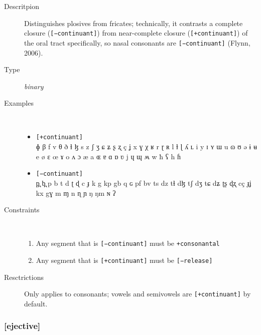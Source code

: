 \documentclass[10pt,letterpaper]{article}
\begin{document}

\begin{description}
\item[Descritpion] Distinguishes plosives from fricates; technically, it contrasts a complete closure (\texttt{[−continuant]}) from near-complete closure (\texttt{[+continuant]}) of the oral tract specifically, so nasal consonants are \texttt{[−continuant]} (Flynn, 2006).
\item[Type] \emph{binary}
\item[Examples]\
  \begin{itemize}
    \item \texttt{[+continuant]}\\
    ɸ β f v θ ð ɬ ɮ s z ʃ ʒ ɕ ʑ ʂ ʐ ç ʝ x ɣ χ ʁ r ɽ ʀ l ɫ ɭ ʎ ʟ i y ɪ ʏ ɯ u ɷ ʊ ə ɨ ʉ e ø ɛ œ ɤ o ʌ ɔ æ a ɶ ɐ ɑ ɒ ʋ j ɥ ɰ ʍ w ħ ʕ h ɦ 
    \item \texttt{[−continuant]}\\
     p̪ b̪ p b t d ʈ ɖ c ɟ k g kp gb q ɢ pf bv ts dz tɬ dɮ tʃ dʒ tɕ dʑ ʈʂ ɖʐ cç ɟʝ kx gɣ m ɱ n ɳ ɲ ŋ ŋm ɴ ʔ 
  \end{itemize}
\item[Constraints]\
  \begin{enumerate}
    \item Any segment that is \texttt{[−continuant]} must be \texttt{+consonantal}
    \item Any segment that is \texttt{[+continuant]} must be \texttt{[−release]}
  \end{enumerate}
\item[Resctrictions] Only applies to consonants; vowels and semivowels are \texttt{[+continuant]} by default.
\end{description}

\subsubsection{[ejective]}
\label{ssub:feature_ejective}
\end{document}
